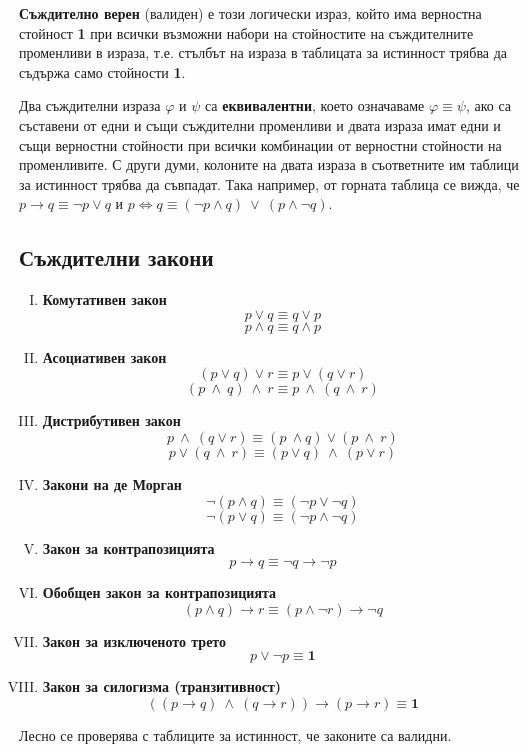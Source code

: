 {\bf Съждително верен} (валиден) е този логически израз, който има верностна стойност {\bf 1} при всички възможни набори на
стойностите на съждителните променливи в израза, т.е. стълбът на израза в таблицата за истинност трябва да съдържа само 
стойности {\bf 1}. 

Два съждителни израза $\varphi$ и $\psi$ са {\bf еквивалентни}, което означаваме $\varphi \equiv \psi$, ако са съставени от 
едни и същи съждителни променливи и двата израза имат едни и същи верностни стойности при всички комбинации от верностни 
стойности на променливите. С други думи, колоните на двата израза в съответните им таблици за истинност трябва да съвпадат.
Така например, от горната таблица се вижда, че 
$p\to q \equiv \neg p \vee q$ и $p \iff q \equiv (\neg{p}\wedge q)\ \vee\ (p\wedge \neg q)$.

\subsection*{Съждителни закони}

\begin{enumerate}[I)]
  \item
    {\bf Комутативен закон}
    \[p\vee q \equiv q\vee p\] 
    \[p \wedge q \equiv q \wedge p\]
  \item
    {\bf Асоциативен закон}
    \[(p\vee q)\vee r \equiv p\vee(q\vee r)\]
    \[(p\ \wedge\ q)\ \wedge\ r \equiv p\ \wedge\ (q\ \wedge\ r)\]
  \item
    {\bf Дистрибутивен закон}
    \[p\ \wedge\ (q \vee r) \equiv (p\ \wedge q)\vee (p\ \wedge\ r)\]
    \[p\vee (q\ \wedge\ r) \equiv (p\vee q)\ \wedge\ (p\vee r)\]
  \item
    {\bf Закони на де Морган}
    \[\neg(p \wedge q) \equiv (\neg p \vee \neg q)\]
    \[\neg(p\vee q) \equiv (\neg p \wedge \neg q)\]
  \item
    {\bf Закон за контрапозицията}
    \[p\rightarrow q \equiv \neg q \rightarrow \neg p\]
  \item
    {\bf Обобщен закон за контрапозицията}
    \[(p \wedge q)\rightarrow r \equiv (p \wedge \neg r) \rightarrow \neg q\]
  \item
    {\bf Закон за изключеното трето}
    \[p\vee \neg p \equiv {\mathbf 1}\]
  \item
    {\bf Закон за силогизма (транзитивност)}
    \[ ((p\rightarrow q)\ \wedge\ (q\rightarrow r)) \rightarrow (p\rightarrow r) \equiv {\mathbf 1}\]
\end{enumerate}

Лесно се проверява с таблиците за истинност, че законите са валидни.



